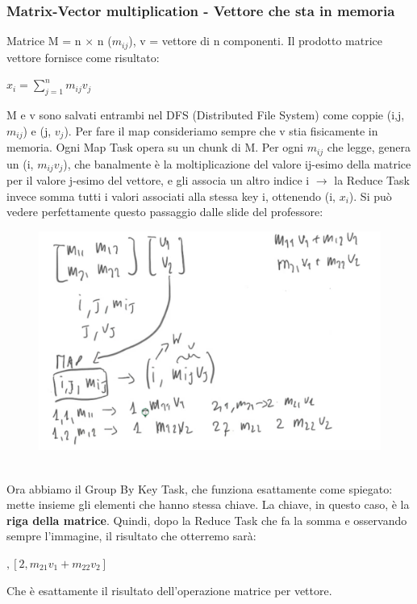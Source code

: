 \subsubsection{Matrix-Vector multiplication - Vettore che sta in memoria}
Matrice M = n $\times$ n ($m_{ij}$), v = vettore di n componenti. Il prodotto matrice vettore fornisce come risultato:
\begin{center}
    \begin{math}
        x_i = \sum^{n}_{j=1} m_{ij} v_j
    \end{math}
\end{center}
M e v sono salvati entrambi nel DFS (Distributed File System) come coppie (i,j, $m_{ij}$) e (j, $v_j$). Per fare il map consideriamo sempre che v stia fisicamente in memoria. Ogni Map Task opera su un chunk di M. Per ogni $m_{ij}$ che legge, genera un (i, $m_{ij} v_j$), che banalmente è la moltiplicazione del valore ij-esimo della matrice per il valore j-esimo del vettore, e gli associa un altro indice i $\rightarrow$ la Reduce Task invece somma tutti i valori associati alla stessa key i, ottenendo (i, $x_i$). Si può vedere perfettamente questo passaggio dalle slide del professore: 
\\
\begin{figure}[th]
    \centering
    \includegraphics[scale=0.5]{MapReduce/img/MatrixVector.png}
    \label{fig:matrixvec}
\end{figure}
\\
Ora abbiamo il Group By Key Task, che funziona esattamente come spiegato: mette insieme gli elementi che hanno stessa chiave. La chiave, in questo caso, è la \textbf{riga della matrice}. Quindi, dopo la Reduce Task che fa la somma e osservando sempre l'immagine, il risultato che otterremo sarà:
\begin{center}
    \begin{math}
        [1, m_{11} v_1 + m_{12} v_2], [2, m_{21} v_1 + m_{22} v_2] 
    \end{math}
\end{center}
Che è esattamente il risultato dell'operazione matrice per vettore.

